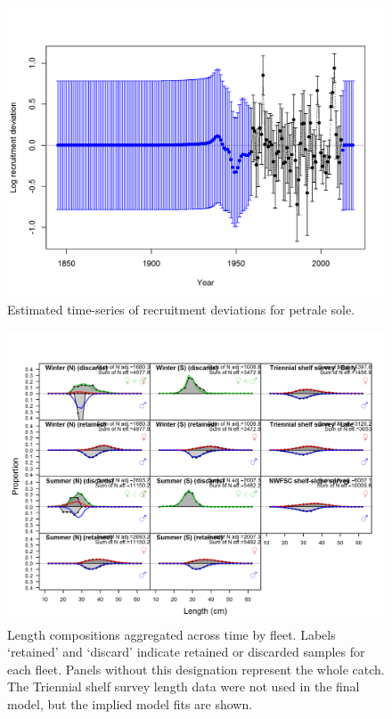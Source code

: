 \documentclass[12pt,]{article}
\begin{document}
\FloatBarrier

\begin{figure}
\centering
\includegraphics{r4ss/plots_mod1/recdevs2_withbars.png}
\caption{Estimated time-series of recruitment deviations for petrale
sole. \label{fig:recdevs}}
\end{figure}

\FloatBarrier

\begin{figure}
\centering
\includegraphics{r4ss/plots_mod1/comp_lenfit__aggregated_across_time.png}
\caption{Length compositions aggregated across time by fleet. Labels
`retained' and `discard' indicate retained or discarded samples for each
fleet. Panels without this designation represent the whole catch. The
Triennial shelf survey length data were not used in the final model, but
the implied model fits are shown. \label{fig:length_agg}}
\end{figure}
\end{document}
